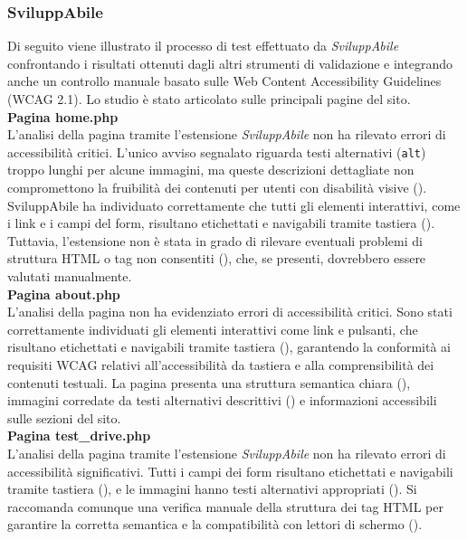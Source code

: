 \subsubsection{SviluppAbile}
\noindent Di seguito viene illustrato il processo di test effettuato da \textit{SviluppAbile} confrontando i risultati ottenuti dagli altri strumenti di validazione e integrando anche un controllo manuale basato sulle Web Content Accessibility Guidelines (WCAG 2.1). Lo studio è stato articolato sulle principali pagine del sito.\\

\noindent \textbf{Pagina home.php}\\
L’analisi della pagina tramite l’estensione \textit{SviluppAbile} non ha rilevato errori di accessibilità critici. L’unico avviso segnalato riguarda testi alternativi (\texttt{alt}) troppo lunghi per alcune immagini, ma queste descrizioni dettagliate non compromettono la fruibilità dei contenuti per utenti con disabilità visive ({}).  
SviluppAbile ha individuato correttamente che tutti gli elementi interattivi, come i link e i campi del form, risultano etichettati e navigabili tramite tastiera ({}). Tuttavia, l’estensione non è stata in grado di rilevare eventuali problemi di struttura HTML o tag non consentiti ({}), che, se presenti, dovrebbero essere valutati manualmente.\\

\noindent \textbf{Pagina about.php}\\
L’analisi della pagina non ha evidenziato errori di accessibilità critici. Sono stati correttamente individuati gli elementi interattivi come link e pulsanti, che risultano etichettati e navigabili tramite tastiera ({}), garantendo la conformità ai requisiti WCAG relativi all’accessibilità da tastiera e alla comprensibilità dei contenuti testuali.  
La pagina presenta una struttura semantica chiara ({}), immagini corredate da testi alternativi descrittivi ({}) e informazioni accessibili sulle sezioni del sito.\\

\noindent \textbf{Pagina test\_drive.php}\\
L’analisi della pagina tramite l’estensione \textit{SviluppAbile} non ha rilevato errori di accessibilità significativi. Tutti i campi dei form risultano etichettati e navigabili tramite tastiera ({}), e le immagini hanno testi alternativi appropriati ({}). Si raccomanda comunque una verifica manuale della struttura dei tag HTML per garantire la corretta semantica e la compatibilità con lettori di schermo ({}).\\

